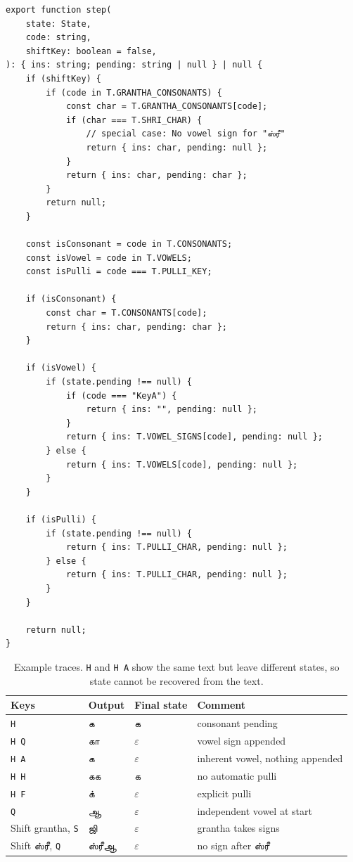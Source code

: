 \documentclass[11pt,a4paper]{article}
\newcommand{\tam}[1]{{\tamilfont #1}}
\newcommand{\empt}{\varepsilon}
\begin{document}
\begin{lstlisting}
export function step(
	state: State,
	code: string,
	shiftKey: boolean = false,
): { ins: string; pending: string | null } | null {
	if (shiftKey) {
		if (code in T.GRANTHA_CONSONANTS) {
			const char = T.GRANTHA_CONSONANTS[code];
			if (char === T.SHRI_CHAR) {
				// special case: No vowel sign for "ஸ்ரீ"
				return { ins: char, pending: null };
			}
			return { ins: char, pending: char };
		}
		return null;
	}

	const isConsonant = code in T.CONSONANTS;
	const isVowel = code in T.VOWELS;
	const isPulli = code === T.PULLI_KEY;

	if (isConsonant) {
		const char = T.CONSONANTS[code];
		return { ins: char, pending: char };
	}

	if (isVowel) {
		if (state.pending !== null) {
			if (code === "KeyA") {
				return { ins: "", pending: null };
			}
			return { ins: T.VOWEL_SIGNS[code], pending: null };
		} else {
			return { ins: T.VOWELS[code], pending: null };
		}
	}

	if (isPulli) {
		if (state.pending !== null) {
			return { ins: T.PULLI_CHAR, pending: null };
		} else {
			return { ins: T.PULLI_CHAR, pending: null };
		}
	}

	return null;
}
\end{lstlisting}
\label{tab:example_traces}
\begin{table}[h]
\centering
\begin{tabular}{llll}
\toprule
Keys & Output & Final state & Comment\\
\midrule
\texttt{H} & \tam{க} & \tam{க} & consonant pending\\
\texttt{H Q} & \tam{கா} & $\empt$ & vowel sign appended\\
\texttt{H A} & \tam{க} & $\empt$ & inherent vowel, nothing appended\\
\texttt{H H} & \tam{கக} & \tam{க} & no automatic pulli\\
\texttt{H F} & \tam{க்} & $\empt$ & explicit pulli\\
\texttt{Q} & \tam{ஆ} & $\empt$ & independent vowel at start\\
Shift grantha, \texttt{S} & \tam{ஜி} & $\empt$ & grantha takes signs\\
Shift \tam{ஸ்ரீ}, \texttt{Q} & \tam{ஸ்ரீஆ} & $\empt$ & no sign after \tam{ஸ்ரீ}\\
\bottomrule
\end{tabular}
\caption{Example traces. \texttt{H} and \texttt{H A} show the same text but
leave different states, so state cannot be recovered from the text.}
\end{table}
\end{document}
